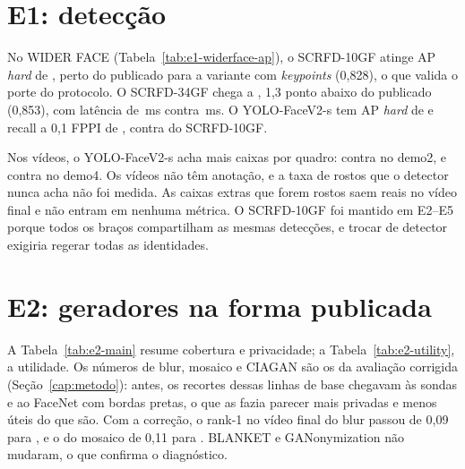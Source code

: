 \begin{table}[ht]\centering
\caption{E0: limiar \emph{in-domain} e TAR a FAR 1\% por vídeo e reconhecedor.}
\label{tab:e0-recognizers}

\fonteautor
\end{table}

\section{E1: detecção}

No WIDER FACE (Tabela~\ref{tab:e1-widerface-ap}), o SCRFD-10GF atinge AP \emph{hard} de , perto do publicado para a variante com \emph{keypoints} (0,828), o que valida o porte do protocolo. O SCRFD-34GF chega a , 1,3 ponto abaixo do publicado (0,853), com latência de \,ms contra \,ms. O YOLO-FaceV2-s tem AP \emph{hard} de  e recall a 0,1 FPPI de , contra  do SCRFD-10GF.

Nos vídeos, o YOLO-FaceV2-s acha mais caixas por quadro:  contra  no demo2, e  contra  no demo4. Os vídeos não têm anotação, e a taxa de rostos que o detector nunca acha não foi medida. As caixas extras que forem rostos saem reais no vídeo final e não entram em nenhuma métrica. O SCRFD-10GF foi mantido em E2--E5 porque todos os braços compartilham as mesmas detecções, e trocar de detector exigiria regerar todas as identidades.

\begin{table}[ht]\centering
\caption{E1: WIDER FACE val, AP oficial e custo.}
\label{tab:e1-widerface-ap}

\fonteautor
\end{table}

\section{E2: geradores na forma publicada}

A Tabela~\ref{tab:e2-main} resume cobertura e privacidade; a Tabela~\ref{tab:e2-utility}, a utilidade. Os números de blur, mosaico e CIAGAN são os da avaliação corrigida (Seção~\ref{cap:metodo}): antes, os recortes dessas linhas de base chegavam às sondas e ao FaceNet com bordas pretas, o que as fazia parecer mais privadas e menos úteis do que são. Com a correção, o rank-1 no vídeo final do blur passou de 0,09 para , e o do mosaico de 0,11 para . BLANKET e GANonymization não mudaram, o que confirma o diagnóstico.

